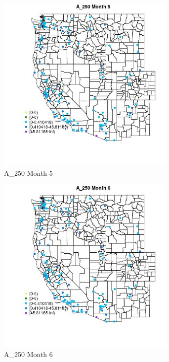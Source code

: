 \begin{figure} 
\centering  
\includegraphics[width=0.77\textwidth]{Code_Outputs/Report_ML_input_PM25_Step4_part_e_de_duplicated_aves_MapObsMo5A_250.jpg} 
\caption{\label{fig:Report_ML_input_PM25_Step4_part_e_de_duplicated_avesMapObsMo5A_250}A_250 Month 5} 
\end{figure} 
 

\begin{figure} 
\centering  
\includegraphics[width=0.77\textwidth]{Code_Outputs/Report_ML_input_PM25_Step4_part_e_de_duplicated_aves_MapObsMo6A_250.jpg} 
\caption{\label{fig:Report_ML_input_PM25_Step4_part_e_de_duplicated_avesMapObsMo6A_250}A_250 Month 6} 
\end{figure} 
 

